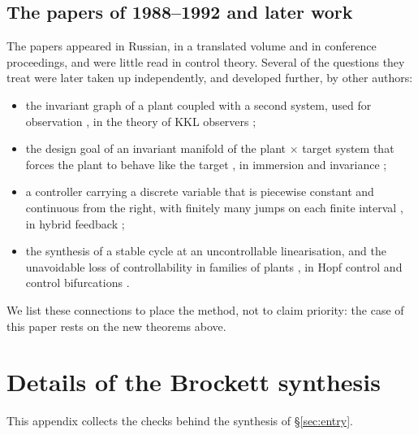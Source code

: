 \documentclass[11pt,reqno]{amsart}
\theoremstyle{plain}
\theoremstyle{definition}
\theoremstyle{remark}
\begin{document}
\subsection{The papers of 1988--1992 and later work}
The papers \cite{Shosh1988,Shosh1990,Shosh1991,Shosh1992} appeared in Russian, in a translated volume and in
conference proceedings, and were little read in control theory. Several of the questions they treat were later
taken up independently, and developed further, by other authors:
\begin{itemize}
  \item the invariant graph of a plant coupled with a second system, used for observation \cite[\S6]{Shosh1990}, in
    the theory of KKL observers \cite{KazantzisKravaris1998,KrenerXiao2002,AndrieuPraly2006};
  \item the design goal of an invariant manifold of the plant $\times$ target system that forces the plant to
    behave like the target \cite[\S2.3]{Shosh1990}, in immersion and invariance \cite{AstolfiOrtega2003};
  \item a controller carrying a discrete variable that is piecewise constant and continuous from the right, with
    finitely many jumps on each finite interval \cite[\S3]{Shosh1990}, in hybrid feedback
    \cite{HespanhaMorse1999,Prieur2001,GoebelSanfeliceTeel2012};
  \item the synthesis of a stable cycle at an uncontrollable linearisation, and the unavoidable loss of
    controllability in families of plants \cite[\S\S4.3--4.11]{Shosh1990}, in Hopf control and control
    bifurcations \cite{Kang1998,HamziKangBarbot2004,KrenerKangChang2004}.
\end{itemize}
We list these connections to place the method, not to claim priority: the case of this paper rests on the new
theorems above.


\label{pg:mainend}
\appendix

\section{Details of the Brockett synthesis}\label{app:brockett}
This appendix collects the checks behind the synthesis of \S\ref{sec:entry}.
\end{document}
